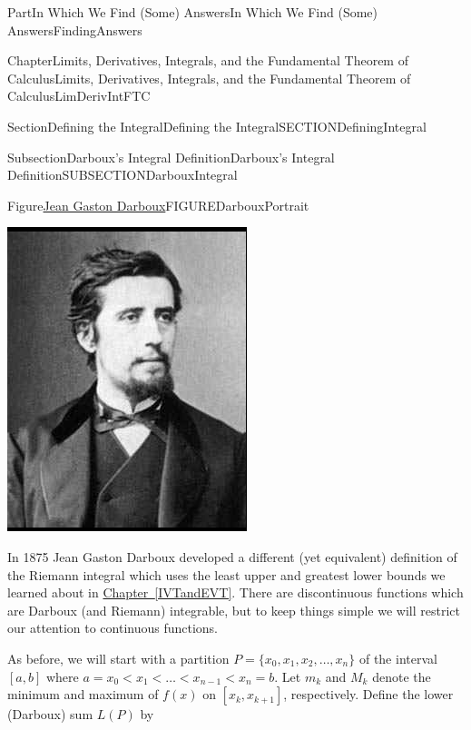 \documentclass[oneside,10pt,]{book}
\newcommand{\xreffont}{\relax}
\numberwithin{equation}{part}
\newcommand{\lt}{<}
\begin{document}
\begin{partptx}{Part}{In Which We Find (Some) Answers}{}{In Which We Find (Some) Answers}{}{}{FindingAnswers}
\begin{chapterptx}{Chapter}{Limits, Derivatives, Integrals, and the Fundamental Theorem of Calculus}{}{Limits, Derivatives, Integrals, and the Fundamental Theorem of Calculus}{}{}{LimDerivIntFTC}
\begin{sectionptx}{Section}{Defining the Integral}{}{Defining the Integral}{}{}{SECTIONDefiningIntegral}
\begin{subsectionptx}{Subsection}{Darboux's Integral Definition}{}{Darboux's Integral Definition}{}{}{SUBSECTIONDarbouxIntegral}
\begin{figureptx}{Figure}{\href{https://mathshistory.st-andrews.ac.uk/Biographies/Darboux/}{Jean Gaston Darboux}\protect\footnotemark{}}{FIGUREDarbouxPortrait}{}
\begin{image}{0.325}{0.35}{0.325}{}
\includegraphics[width=\linewidth]{external/images/Darboux.png}
\end{image}%
\tcblower
\end{figureptx}%
%
In 1875 Jean Gaston Darboux developed a different (yet equivalent) definition of the Riemann integral which uses the least upper and greatest lower bounds we learned about in \hyperref[IVTandEVT]{Chapter~{\xreffont\ref{IVTandEVT}}}.  There are discontinuous functions which are Darboux (and Riemann) integrable, but to keep things simple we will restrict our attention to continuous functions.%
\par
As before, we will start with a partition \(P=\{x_0, x_1,x_2,
\dots , x_n\}\) of the interval \([a,b]\) where \(a=x_0\lt
x_1\lt \dots \lt x_{n-1}\lt x_n=b\).  Let \(m_k\) and \(M_k\) denote the minimum and maximum of \(f(x)\) on \([x_k,x_{k+1}]\), respectively.  Define the lower (Darboux) sum \(L(P)\) by%

\end{subsectionptx}
\end{sectionptx}
\end{chapterptx}
\end{partptx}
\end{document}
